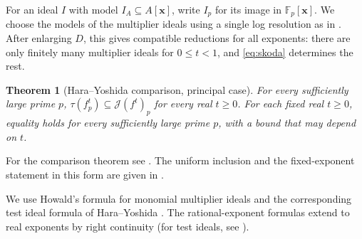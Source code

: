 \documentclass[11pt]{amsart}
\numberwithin{equation}{section}
\newtheorem{theorem}{Theorem}[section]
\theoremstyle{definition}
\newtheorem{remark}[theorem]{Remark}
\newcommand{\J}{\mathcal J}
\newcommand{\Z}{\mathbb Z}
\newcommand{\F}{\mathbb F}
\newcommand{\xx}{\boldsymbol{x}}
\begin{document}
For an ideal $I$ with model $I_A\subseteq A[\xx]$, write $I_p$ for
its image in $\F_p[\xx]$. We choose the models of the multiplier ideals
using a single log resolution as in \cite[Section~3.2]{MS}.
After enlarging $D$, this gives compatible reductions for all exponents:
there are only finitely many multiplier ideals for $0\le t<1$, and
\eqref{eq:skoda} determines the rest.

\begin{theorem}[Hara--Yoshida comparison, principal case]
For every sufficiently large prime $p$,
$\tau(f_p^t)\subseteq\J(f^t)_p$ for every real $t\ge0$.
For each fixed real $t\ge0$, equality holds for every sufficiently
large prime $p$, with a bound that may depend on $t$.
\end{theorem}
For the comparison theorem see \cite{HY}. The uniform inclusion and the
fixed-exponent statement in this form are given in \cite[Section~4]{MS}.


We use Howald's formula for monomial multiplier ideals \cite{How01}
and the corresponding test ideal formula of Hara--Yoshida
\cite[Theorem~6.10(3)]{HY}. The rational-exponent formulas extend to
real exponents by right continuity (for test ideals, see
\cite[Proposition~2.14]{BMS}).
\end{document}
